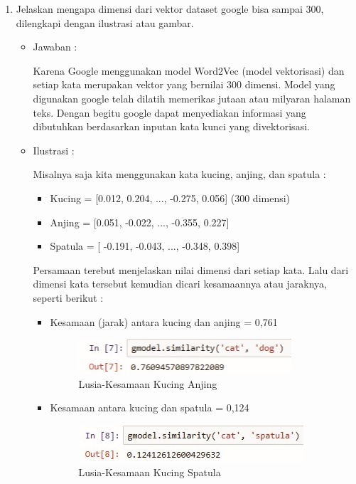\begin{enumerate}
\item Jelaskan mengapa dimensi dari vektor dataset google bisa sampai 300, dilengkapi
dengan ilustrasi atau gambar.
	\begin{itemize}
	\item Jawaban :
		\par Karena Google menggunakan model Word2Vec (model vektorisasi) dan setiap kata merupakan vektor yang bernilai 300 dimensi. Model yang digunakan google telah dilatih memerikas jutaan atau milyaran halaman teks. Dengan begitu google dapat menyediakan informasi yang dibutuhkan berdasarkan inputan kata kunci yang divektorisasi.
	\item Ilustrasi :
		\par Misalnya saja kita menggunakan kata kucing, anjing, dan spatula :
	
	\begin{itemize}
	\item Kucing = [0.012, 0.204, ..., -0.275, 0.056] (300 dimensi)
	\item Anjing = [0.051, -0.022, ..., -0.355, 0.227]
	\item Spatula = [ -0.191, -0.043, ..., -0.348, 0.398]
	\end{itemize}
	
	\par Persamaan terebut menjelaskan nilai dimensi dari setiap kata. Lalu dari dimensi kata tersebut kemudian dicari kesamaannya atau jaraknya, seperti berikut :	
	
	\begin{itemize}
	\item Kesamaan (jarak) antara kucing dan anjing = 0,761
		\begin{figure}[ht]
		\centering
		\includegraphics[scale=0.5]{figures/p2a.jpg}
		\caption{Lusia-Kesamaan Kucing Anjing}
		\label{contoh}
		\end{figure}
	\item Kesamaan antara kucing dan spatula = 0,124
		\begin{figure}[ht]
		\centering
		\includegraphics[scale=0.5]{figures/p2b.jpg}
		\caption{Lusia-Kesamaan Kucing Spatula}
		\label{contoh}
		\end{figure}
	\end{itemize}
	

\end{itemize}
\end{enumerate}
